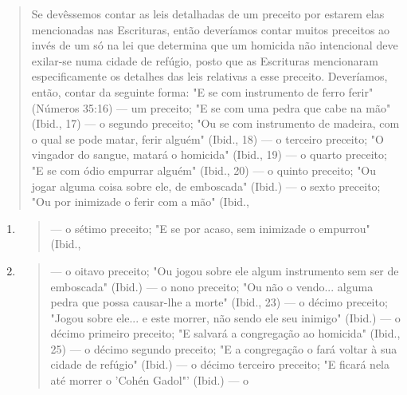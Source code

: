 \begin{quote}
Se devêssemos contar as leis detalhadas de um preceito por estarem elas
mencionadas nas Escrituras, então deveríamos contar muitos preceitos ao
invés de um só na lei que determina que um homicida não intencional deve
exilar-se numa cidade de refúgio, posto que as Escrituras mencionaram
especi­ficamente os detalhes das leis relativas a esse preceito.
Deveríamos, então, con­tar da seguinte forma: "E se com instrumento de
ferro ferir" (Números 35:16) --- um preceito; "E se com uma pedra que
cabe na mão" (Ibid., 17) --- o segun­do preceito; "Ou se com instrumento
de madeira, com o qual se pode matar, ferir alguém" (Ibid., 18) --- o
terceiro preceito; "O vingador do sangue, matará o homicida" (Ibid., 19)
--- o quarto preceito; "E se com ódio empurrar alguém" (Ibid., 20) --- o
quinto preceito; "Ou jogar alguma coisa sobre ele, de embosca­da"
(Ibid.) --- o sexto preceito; "Ou por inimizade o ferir com a mão"
(Ibid.,
\end{quote}

\begin{enumerate}
\def\labelenumi{\arabic{enumi})}
\setcounter{enumi}{20}
\item
 \begin{quote}
 --- o sétimo preceito; "E se por acaso, sem inimizade o empurrou"
 (Ibid.,
 \end{quote}
\item
 \begin{quote}
 --- o oitavo preceito; "Ou jogou sobre ele algum instrumento sem ser
 de emboscada" (Ibid.) --- o nono preceito; "Ou não o vendo... alguma
 pedra que possa causar-lhe a morte" (Ibid., 23) --- o décimo preceito;
 "Jogou sobre ele... e este morrer, não sendo ele seu inimigo" (Ibid.)
 --- o décimo primeiro precei­to; "E salvará a congregação ao homicida"
 (Ibid., 25) --- o décimo segundo pre­ceito; "E a congregação o fará
 voltar à sua cidade de refúgio" (Ibid.) --- o déci­mo terceiro
 preceito; "E ficará nela até morrer o 'Cohén Gadol"' (Ibid.) --- o
 \end{quote}
\end{enumerate}

